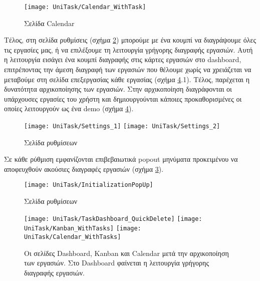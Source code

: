         \begin{figure}[h!] \noindent \centering
            \texttt{[image: UniTask/Calendar\_WithTask]}
            \caption{\centering Σελίδα Calendar}
            \label{fig:unitask_Calendar_WithTask}
        \end{figure}

        Τέλος, στη σελίδα {\ZonaSB ρυθμίσεις} (σχήμα \ref{fig:unitask_Settings}) μπορούμε με ένα κουμπί να διαγράψουμε όλες τις εργασίες μας, ή να επιλέξουμε τη λειτουργία γρήγορης διαγραφής εργασιών. Αυτή η λειτουργία εισάγει ένα κουμπί διαγραφής στις κάρτες εργασιών στο dashboard, επιτρέποντας την άμεση διαγραφή των εργασιών που θέλουμε χωρίς να χρειάζεται να μεταβούμε στη σελίδα επεξεργασίας κάθε εργασίας (σχήμα \ref{fig:unitask_Dashboard_Kanban_Calendar_WithTasks}.1). Τέλος, παρέχεται η δυνατότητα αρχικοποίησης των εργασιών. Στην αρχικοποίηση διαγράφονται οι υπάρχουσες εργασίες του χρήστη και δημιουργούνται κάποιες προκαθορισμένες οι οποίες λειτουργούν ως ένα demo (σχήμα \ref{fig:unitask_Dashboard_Kanban_Calendar_WithTasks}).

        \begin{figure}[h!] \noindent \centering
            \texttt{[image: UniTask/Settings\_1]}
            \texttt{[image: UniTask/Settings\_2]}
            \caption{\centering Σελίδα ρυθμίσεων}
            \label{fig:unitask_Settings}
        \end{figure}

        Σε κάθε ρύθμιση εμφανίζονται επιβεβαιωτικά popout μηνύματα προκειμένου να αποφευχθούν ακούσιες διαγραφές εργασιών (σχήμα \ref{fig:unitask_InitializationPopUp}).

        \begin{figure}[h!] \noindent \centering
            \texttt{[image: UniTask/InitializationPopUp]}
            \caption{\centering Σελίδα ρυθμίσεων}
            \label{fig:unitask_InitializationPopUp}
        \end{figure}

        \begin{figure}[p!] \noindent \centering
            \texttt{[image: UniTask/TaskDashboard\_QuickDelete]}
            \texttt{[image: UniTask/Kanban\_WithTasks]}
            \texttt{[image: UniTask/Calendar\_WithTasks]}
            \caption{\centering Οι σελίδες Dashboard, Kanban και Calendar μετά την αρχικοποίηση των εργασιών. Στο Dashboard φαίνεται η λειτουργία γρήγορης διαγραφής εργασιών.}
            \label{fig:unitask_Dashboard_Kanban_Calendar_WithTasks}
        \end{figure}

